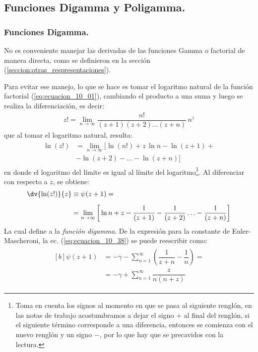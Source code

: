 \subsection{Funciones Digamma y Poligamma.}

\subsubsection{Funciones Digamma.}

No es conveniente manejar las derivadas de las funciones Gamma o factorial de manera directa, como se definieron en la sección (\ref{seccion:otras_respresentaciones}).
\par
Para evitar ese manejo, lo que se hace es tomar el logaritmo natural de la función factorial (\ref{eq:ecuacion_10_01}), cambiando el producto a una suma y luego se realiza la diferenciación, es decir:
\begin{align}
z! = \lim_{n \to \infty} \dfrac{n!}{(z + 1)(z + 2) \ldots (z + n)} \, n^{z}
\label{eq:ecuacion_10_36}
\end{align}
que al tomar el logaritmo natural, resulta:
\begin{align}
\begin{aligned}
\ln (z!) &= \lim_{n \to \infty} \big[ \ln (n!) + z \, \ln n - \ln (z + 1) + \\[0.5em]
&- \ln (z + 2) - \ldots - \ln (z + n) \big]
\end{aligned}
\label{eq:ecuacion_10_37}
\end{align}
en donde el logaritmo del límite es igual al límite del logaritmo\footnote{Toma en cuenta los signos al momento en que se pasa al siguiente renglón, en las notas de trabajo acostumbramos a dejar el signo $+$ al final del renglón, si el siguiente término corresponde a una diferencia, entonces se comienza con el nuevo renglón y un signo $-$, por lo que hay que se precavidos con la lectura.}. Al diferenciar con respecto a $z$, se obtiene:
\begin{align}
\begin{aligned}[b]
\dv{\ln (z!)}{z} &\equiv \psi(z + 1) = \\[0.5em]
&=\lim_{n \to \infty} \bigg[ \ln n + z - \dfrac{1}{(z + 1)} - \dfrac{1}{(z + 2)} \ldots - \dfrac{1}{(z + n)} \bigg]
\end{aligned}
\label{eq:ecuacion_10_38}
\end{align}
La cual define a la \emph{función digamma}. De la expresión para la constante de Euler-Mascheroni, la ec. (\ref{eq:ecuacion_10_38}) se puede reescribir como:
\begin{align}
\begin{aligned}[b]
\psi (z + 1) &= - \gamma - \sum_{n=1}^{\infty} \left( \dfrac{1}{z + n} - \dfrac{1}{n} \right) = \\[0.5em]
&= -\gamma + \sum_{n=1}^{\infty} \dfrac{z}{n (n + z)}
\end{aligned}
\label{eq:ecuacion_10_39}
\end{align}

